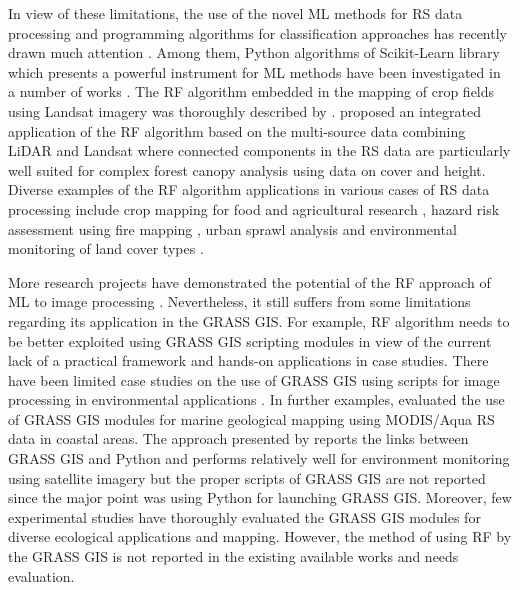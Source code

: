 \documentclass[climate,article,submit,pdftex,moreauthors]{Definitions/mdpi}
\begin{document}
In view of these limitations, the use of the novel ML methods for RS data processing and programming algorithms for classification approaches has recently drawn much attention \cite{Ayhan}. Among them, Python algorithms of Scikit-Learn library which presents a powerful instrument for ML methods have been investigated in a number of works \cite{9884244,9883588,9006205,7724471}. The RF algorithm embedded in the mapping of crop fields using Landsat imagery was thoroughly described by \cite{LUCIANO2021106063}. \cite{AHMED201589} proposed an integrated application of the RF algorithm based on the multi-source data combining LiDAR and Landsat where connected components in the RS data are particularly well suited for complex forest canopy analysis using data on cover and height. Diverse examples of the RF algorithm applications in various cases of RS data processing include crop mapping for food and agricultural research \cite{OLIPHANT2019110,TELUGUNTLA2018325}, hazard risk assessment using fire mapping \cite{COLLINS2020111839}, urban sprawl analysis \cite{GHOSH201431} and environmental monitoring of land cover types \cite{MELVILLE201846,GRINAND201368}. 

More research projects have demonstrated the potential of the RF approach of ML to image processing \cite{COLLINS2020111839,WEI2020112005,WANG202294}. Nevertheless, it still suffers from some limitations regarding its application in the GRASS GIS. For example, RF algorithm needs to be better exploited using GRASS GIS scripting modules in view of the current lack of a practical framework and hands-on applications in case studies. There have been limited case studies on the use of GRASS GIS using scripts for image processing in environmental applications \cite{STRIGARO201668,geomatics5010005,ROCCHINI2017166,7326254}. In further examples, \cite{7326254} evaluated the use of GRASS GIS modules for marine geological mapping using MODIS/Aqua RS data in coastal areas. The approach presented by \cite{6407912} reports the links between GRASS GIS and Python and performs relatively well for environment monitoring using satellite imagery but the proper scripts of GRASS GIS are not reported since the major point was using Python for launching GRASS GIS. Moreover, few experimental studies have thoroughly evaluated the GRASS GIS modules for diverse ecological applications and mapping. However, the method of using RF by the GRASS GIS is not reported in the existing available works and needs evaluation. 
\end{document}
